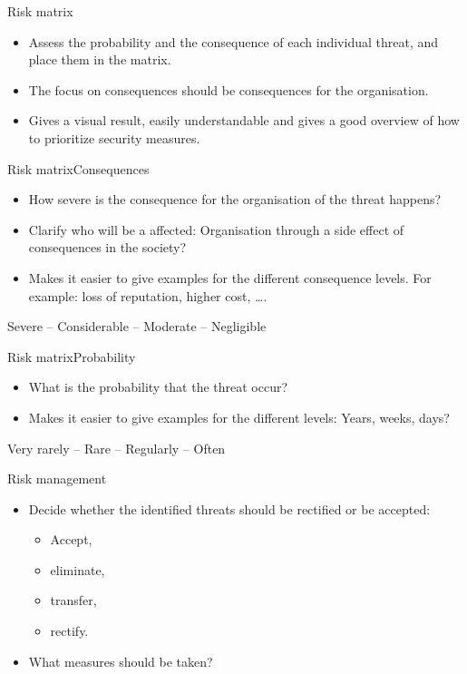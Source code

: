 \documentclass{beamer}
\begin{document}
\begin{frame}{Risk matrix}
  \begin{itemize}
    \item Assess the probability and the consequence of each individual threat,
      and place them in the matrix.
    \item The focus on consequences should be consequences for the organisation.
    \item Gives a visual result, easily understandable and gives a good overview
      of how to prioritize security measures.
  \end{itemize}
\end{frame}

\begin{frame}{Risk matrix}{Consequences}
  \begin{itemize}
    \item How severe is the consequence for the organisation of the threat
      happens?
    \item Clarify who will be a affected: Organisation through a side effect of
      consequences in the society? 
    \item Makes it easier to give examples for the different consequence levels.
      For example: loss of reputation, higher cost, \dots.
  \end{itemize}
  \begin{center}
    Severe -- Considerable -- Moderate -- Negligible
  \end{center}
\end{frame}

\begin{frame}{Risk matrix}{Probability}
  \begin{itemize}
    \item What is the probability that the threat occur?
    \item Makes it easier to give examples for the different levels: Years,
      weeks, days?
  \end{itemize}
  \begin{center}
    Very rarely -- Rare -- Regularly -- Often
  \end{center}
\end{frame}

\begin{frame}{Risk management}
  \begin{itemize}
    \item Decide whether the identified threats should be rectified or be
      accepted:
      \begin{itemize}
        \item Accept,
        \item eliminate,
        \item transfer,
        \item rectify.
      \end{itemize}
    \item What measures should be taken?
  \end{itemize}
\end{frame}
\end{document}
